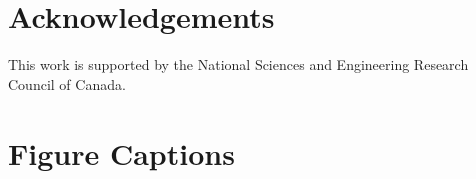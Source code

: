 \documentclass[preprint,5p,authoryear]{elsarticle}
\begin{document}
        
\section*{Acknowledgements}
\label{Ack}
This work is supported by the National Sciences and Engineering Research Council of Canada.








\pagebreak







\pagebreak

\section*{Figure Captions}
\end{document}
